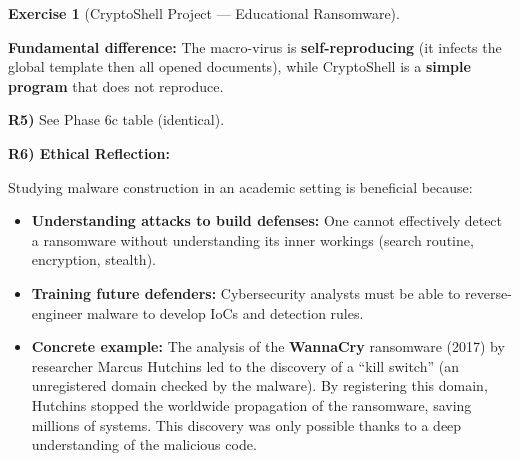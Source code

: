 \documentclass[a4paper,11pt]{article}
\theoremstyle{plain}
\theoremstyle{definition}
\newtheorem{exercice}{Exercise}
\begin{document}
\begin{exercice}[CryptoShell Project --- Educational Ransomware]
\begin{correction}
\textbf{Fundamental difference:} The macro-virus is \textbf{self-reproducing} (it infects the global template then all opened documents), while CryptoShell is a \textbf{simple program} that does not reproduce.

\medskip
\textbf{R5)} See Phase 6c table (identical).

\medskip
\textbf{R6) Ethical Reflection:}

Studying malware construction in an academic setting is beneficial because:
\begin{itemize}
    \item \textbf{Understanding attacks to build defenses:} One cannot effectively detect a ransomware without understanding its inner workings (search routine, encryption, stealth).
    \item \textbf{Training future defenders:} Cybersecurity analysts must be able to reverse-engineer malware to develop IoCs and detection rules.
    \item \textbf{Concrete example:} The analysis of the \textbf{WannaCry} ransomware (2017) by researcher Marcus Hutchins led to the discovery of a ``kill switch'' (an unregistered domain checked by the malware). By registering this domain, Hutchins stopped the worldwide propagation of the ransomware, saving millions of systems. This discovery was only possible thanks to a deep understanding of the malicious code.
\end{itemize}

\end{correction}


\end{exercice}
\end{document}
